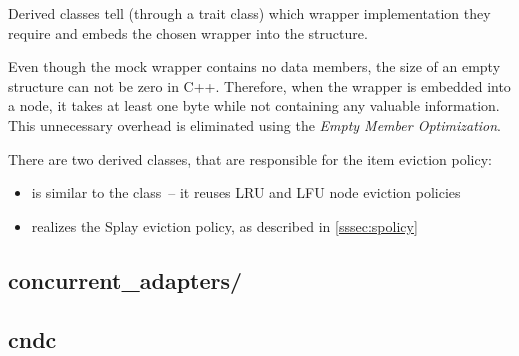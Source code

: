 Derived classes tell  (through a trait class) which wrapper implementation they require and  embeds the chosen wrapper into the  structure.

Even though the mock wrapper contains no data members, the size of an empty structure can not be zero in C++\cite{sizeof_empty}. Therefore, when the wrapper is embedded into a node, it takes at least one byte while not containing any valuable information. This unnecessary overhead is eliminated using the \emph{Empty Member Optimization}\cite{ebo}.


There are two derived classes, that are responsible for the item eviction policy:
 \begin{itemize}[leftmargin=2cm]
 \item [\classname{SplayTreeFairLu}] is similar to the  class~-- it reuses LRU and LFU node eviction policies
 \item [\classname{SplayTreeBottomNode}] realizes the Splay eviction policy, as described in \cref{sssec:spolicy}
\end{itemize}

\subsection{concurrent\_adapters/}

\subsection{cndc}
